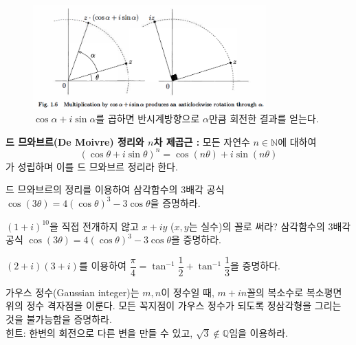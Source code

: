 \begin{figure}[!h]
\begin{center}
\includegraphics[width=0.8\textwidth]{./SaltChapter/fig-1-6}
\end{center}
\caption{$\cos\alpha + i \sin\alpha$를 곱하면 반시계방향으로 $\alpha$만큼 회전한 결과를 얻는다.}
\label{fig-1-6}
\end{figure}

{\bf 드 므와브르(De Moivre) 정리와 $n$차 제곱근 :}
모든 자연수 $n\in\mathbb N$에 대하여
$$
(\cos\theta + i\sin\theta)^n = \cos(n\theta) + i\sin(n\theta)
$$
가 성립하며 이를 드 므와브르 정리라 한다.

\begin{salt_exercise} \label{ex-1-5}
드 므와브르의 정리를 이용하여
삼각함수의 3배각 공식 $\cos (3\theta) = 4(\cos\theta)^3 - 3\cos\theta$을 증명하라.
\end{salt_exercise}

\begin{salt_exercise} \label{ex-1-6}
$(1+i)^{10}$을 직접 전개하지 않고 $x+iy$ ($x,y$는 실수)의 꼴로 써라?
삼각함수의 3배각 공식 $\cos (3\theta) = 4(\cos\theta)^3 - 3\cos\theta$을 증명하라.
\end{salt_exercise}

\begin{salt_exercise} \label{ex-1-7}
$(2+i)(3+i)$를 이용하여
$\dfrac\pi4 = \tan^{-1}\dfrac12 + \tan^{-1}\dfrac13$을 증명하다.
\end{salt_exercise}

\begin{salt_exercise} \label{ex-1-8}
가우스 정수(Gaussian integer)는 
$m, n$이 정수일 때, $m+in$꼴의 복소수로
복소평면 위의 정수 격자점을 이룬다.
모든 꼭지점이 가우스 정수가 되도록 정삼각형을 그리는 것을 불가능함을 증명하라. \\[1ex]
힌트: 한변의 회전으로 다른 변을 만들 수 있고, $\sqrt{3}\not\in \mathbb Q$임을 이용하라.
\end{salt_exercise}

